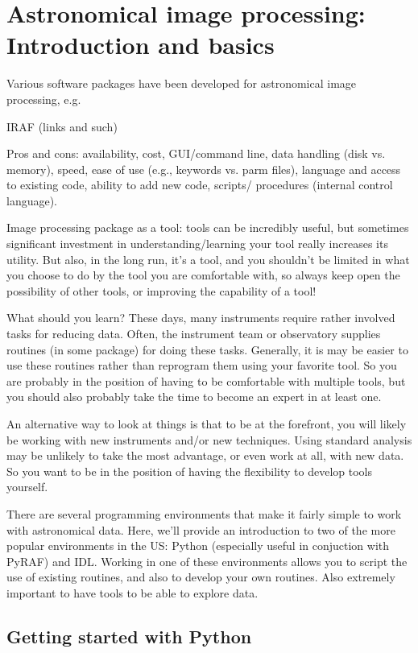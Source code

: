 \documentclass[12pt]{article}
\begin{document}
\section{Astronomical image processing: Introduction and basics}
Various software packages have been developed for astronomical image processing,
e.g.\
\begin{itemize*}
    \item IRAF (links and such)
\end{itemize*}
Pros and cons: availability, cost, GUI/command line, data handling
(disk vs. memory), speed, ease of use (e.g., keywords vs. parm files),
language and access to existing code, ability to add new code,
scripts/ procedures (internal control language).

Image processing package as a tool: tools can be incredibly useful,
but sometimes significant investment in understanding/learning your
tool really increases its utility. But also, in the long run, it's a
tool, and you shouldn't be limited in what you choose to do by the
tool you are comfortable with, so always keep open the possibility of
other tools, or improving the capability of a tool!

What should you learn? These days, many instruments require rather
involved tasks for reducing data. Often, the instrument team or
observatory supplies routines (in some package) for doing these tasks.
Generally, it is may be easier to use these routines rather than
reprogram them using your favorite tool. So you are probably in the
position of having to be comfortable with multiple tools, but you
should also probably take the time to become an expert in at least
one.

An alternative way to look at things is that to be at the forefront,
you will likely be working
with new instruments and/or new techniques. Using standard analysis
may be unlikely to take the most advantage, or even work at all, with
new data. So you want to be in the position of having the flexibility
to develop tools yourself.

There are several programming environments that make it fairly simple
to work with astronomical data. Here, we'll provide an introduction to
two of the more popular environments in the US: Python (especially
useful in conjuction with PyRAF) and IDL. Working in one of these
environments allows you to script the use of existing routines, and
also to develop your own routines. Also extremely important to have
tools to be able to explore data.

\subsection{Getting started with Python}
\end{document}
